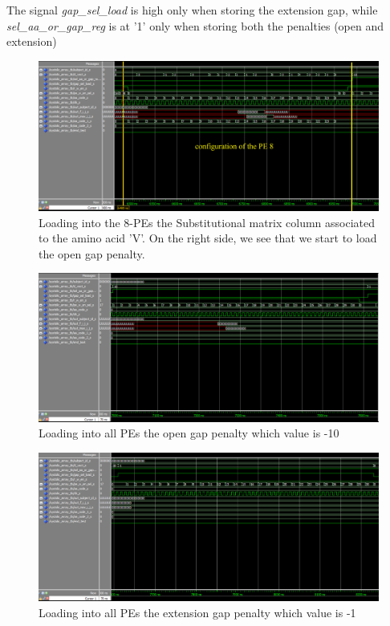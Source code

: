 The signal \textit{gap\_sel\_load} is high only when storing the extension gap, while \textit{sel\_aa\_or\_gap\_reg} is at '1' only when storing both the penalties (open and extension)
\begin{figure}[h!]
	\centering
	\includegraphics[width=\textwidth]{imm/sw/load_pe_8.png}
	\caption{Loading into the 8-PEs the Substitutional matrix column associated to the amino acid 'V'. On the right side, we see that we start to load the open gap penalty.} 
	\label{tb_sw_pe8}
\end{figure}
\begin{figure}[h!]
	\centering
	\includegraphics[width=\textwidth]{imm/sw/open_gap_10.png}
	\caption{Loading into all PEs the open gap penalty which value is -10} 
	\label{tb_open_gap_10}
\end{figure}
\begin{figure}[h!]
	\centering
	\includegraphics[width=\textwidth]{imm/sw/ext_gap.png}
	\caption{Loading into all PEs the extension gap penalty which value is -1} 
	\label{tb_ext_gap}
\end{figure}
